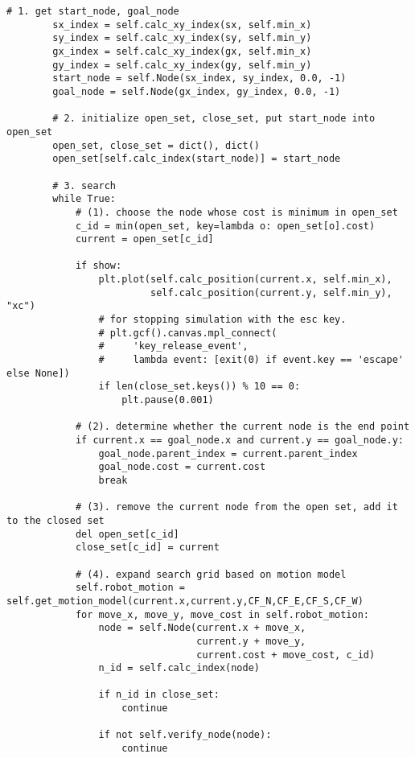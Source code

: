\begin{lstlisting}[caption=Testing codes (\autoref{TestResults}), label=TestCodes]
        # 1. get start_node, goal_node
        sx_index = self.calc_xy_index(sx, self.min_x)
        sy_index = self.calc_xy_index(sy, self.min_y)
        gx_index = self.calc_xy_index(gx, self.min_x)
        gy_index = self.calc_xy_index(gy, self.min_y)
        start_node = self.Node(sx_index, sy_index, 0.0, -1)
        goal_node = self.Node(gx_index, gy_index, 0.0, -1)

        # 2. initialize open_set, close_set, put start_node into open_set
        open_set, close_set = dict(), dict()
        open_set[self.calc_index(start_node)] = start_node

        # 3. search
        while True:
            # (1). choose the node whose cost is minimum in open_set
            c_id = min(open_set, key=lambda o: open_set[o].cost)
            current = open_set[c_id]
           
            if show: 
                plt.plot(self.calc_position(current.x, self.min_x),
                         self.calc_position(current.y, self.min_y), "xc")
                # for stopping simulation with the esc key.
                # plt.gcf().canvas.mpl_connect(
                #     'key_release_event',
                #     lambda event: [exit(0) if event.key == 'escape' else None])
                if len(close_set.keys()) % 10 == 0:
                    plt.pause(0.001)

            # (2). determine whether the current node is the end point
            if current.x == goal_node.x and current.y == goal_node.y:
                goal_node.parent_index = current.parent_index
                goal_node.cost = current.cost
                break

            # (3). remove the current node from the open set, add it to the closed set
            del open_set[c_id]
            close_set[c_id] = current

            # (4). expand search grid based on motion model
            self.robot_motion = self.get_motion_model(current.x,current.y,CF_N,CF_E,CF_S,CF_W)
            for move_x, move_y, move_cost in self.robot_motion:
                node = self.Node(current.x + move_x,
                                 current.y + move_y,
                                 current.cost + move_cost, c_id)
                n_id = self.calc_index(node)

                if n_id in close_set:
                    continue

                if not self.verify_node(node):
                    continue


\end{lstlisting}
